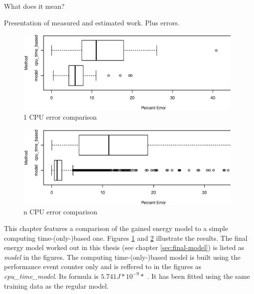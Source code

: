 \label{sec:evaluation}

What does it mean?


\label{sec:error}

Presentation of measured and estimated work. Plus errors.


\label{sec:time-based}

\begin{figure}
  \centering
    \includegraphics[width=\textwidth]{fig/1cpu-bench-errs.eps}
  \caption{1 CPU error comparison}
  \label{fig:errs-1cpu}
\end{figure}

\begin{figure}
  \centering
    \includegraphics[width=\textwidth]{fig/Ncpu-bench-errs.eps}
  \caption{n CPU error comparison}
  \label{fig:errs-ncpu}
\end{figure}

This chapter features a comparison of the gained energy model to a simple
computing time-(only-)based one. Figures \ref{fig:errs-1cpu} and
\ref{fig:errs-ncpu} illustrate the results. The final energy model worked out in
this thesis (see chapter \ref{sec:final-model}) is listed as \emph{model} in the
figures. The computing time-(only-)based model is built using the performance
event counter  only and is reffered to in the
figures as \emph{cpu\_time\_model}. Its formula is $5.741J * 10^{-9} *$
. It has been fitted using the same training data as
the regular model.

